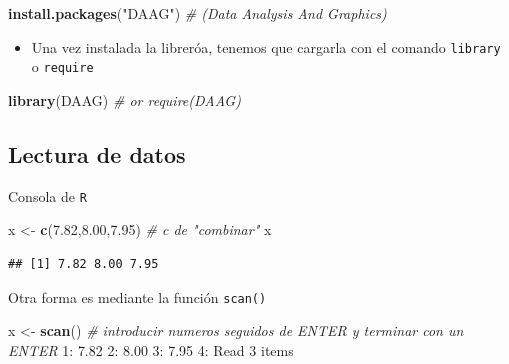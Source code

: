\documentclass[]{article}
\def\tightlist{}
\newenvironment{Shaded}{\begin{snugshade}}{\end{snugshade}}
\newcommand{\KeywordTok}[1]{\textcolor[rgb]{0.13,0.29,0.53}{\textbf{{#1}}}}
\newcommand{\DecValTok}[1]{\textcolor[rgb]{0.00,0.00,0.81}{{#1}}}
\newcommand{\FloatTok}[1]{\textcolor[rgb]{0.00,0.00,0.81}{{#1}}}
\newcommand{\StringTok}[1]{\textcolor[rgb]{0.31,0.60,0.02}{{#1}}}
\newcommand{\CommentTok}[1]{\textcolor[rgb]{0.56,0.35,0.01}{\textit{{#1}}}}
\newcommand{\NormalTok}[1]{{#1}}
\numberwithin{equation}{section}
\begin{document}
\begin{Shaded}
\begin{Highlighting}[]
\KeywordTok{install.packages}\NormalTok{(}\StringTok{"DAAG"}\NormalTok{) }\CommentTok{# (Data Analysis And Graphics)}
\end{Highlighting}
\end{Shaded}

\begin{itemize}
\tightlist
\item
  Una vez instalada la libreróa, tenemos que cargarla con el comando
  \texttt{library} o \texttt{require}
\end{itemize}

\begin{Shaded}
\begin{Highlighting}[]
\KeywordTok{library}\NormalTok{(DAAG) }\CommentTok{# or require(DAAG)}
\end{Highlighting}
\end{Shaded}

\subsection{Lectura de datos}\label{lectura-de-datos}

Consola de \texttt{R}

\begin{Shaded}
\begin{Highlighting}[]
\NormalTok{x <-}\StringTok{ }\KeywordTok{c}\NormalTok{(}\FloatTok{7.82}\NormalTok{,}\FloatTok{8.00}\NormalTok{,}\FloatTok{7.95}\NormalTok{) }\CommentTok{# c de "combinar"}
\NormalTok{x}
\end{Highlighting}
\end{Shaded}

\begin{verbatim}
## [1] 7.82 8.00 7.95
\end{verbatim}

Otra forma es mediante la función \texttt{scan()}

\begin{Shaded}
\begin{Highlighting}[]
\NormalTok{x <-}\StringTok{ }\KeywordTok{scan}\NormalTok{()  }\CommentTok{# introducir numeros seguidos de ENTER y terminar con un ENTER}
\DecValTok{1}\NormalTok{:}\StringTok{ }\FloatTok{7.82}
\DecValTok{2}\NormalTok{:}\StringTok{ }\FloatTok{8.00}
\DecValTok{3}\NormalTok{:}\StringTok{ }\FloatTok{7.95}
\DecValTok{4}\NormalTok{:}\StringTok{ }
\NormalTok{Read }\DecValTok{3} \NormalTok{items}
\end{Highlighting}
\end{Shaded}
\end{document}
